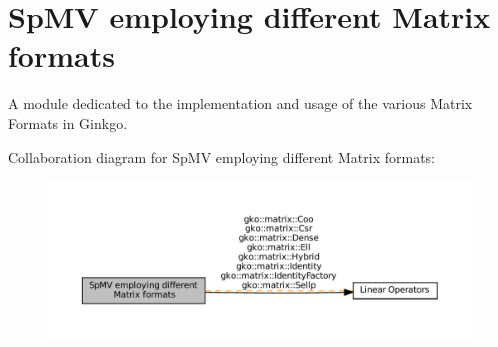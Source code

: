 \hypertarget{group__mat__formats}{}\section{Sp\+MV employing different Matrix formats}
\label{group__mat__formats}


A module dedicated to the implementation and usage of the various Matrix Formats in Ginkgo.  


Collaboration diagram for Sp\+MV employing different Matrix formats\+:
\nopagebreak
\begin{figure}[H]
\begin{center}
\leavevmode
\includegraphics[width=350pt]{group__mat__formats}
\end{center}
\end{figure}
